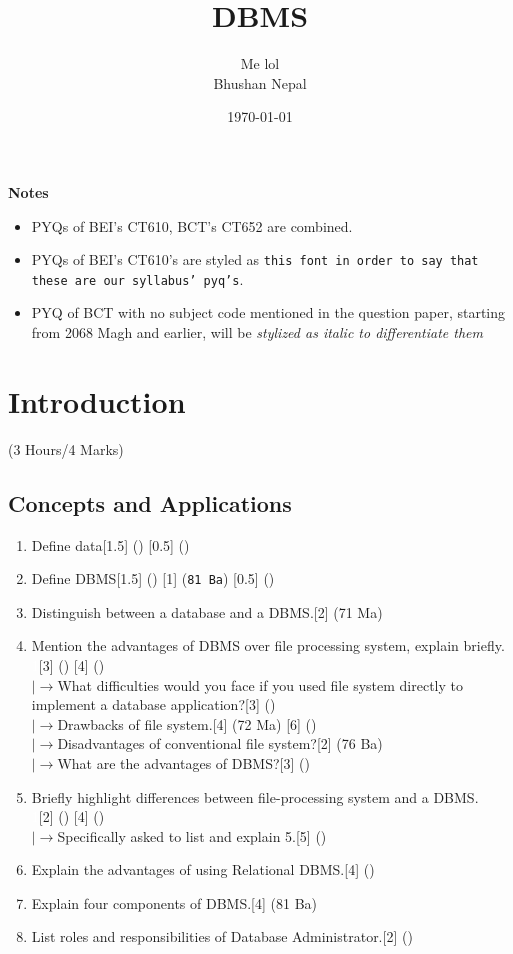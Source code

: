 \documentclass[12pt]{article}
\title{DBMS}
\author{Me lol\\Bhushan Nepal}
\date{\today}
\newcommand{\lb}{\\$\left|\rightarrow\right.$}
\newcommand{\enter}{\\\textcolor{white}{1}}
\begin{document}
\maketitle
\vspace{13cm}
\begin{large}\textbf{Notes}\end{large}
\begin{itemize}
\item PYQs of BEI's CT610, BCT's CT652 are combined.
\item PYQs of BEI's CT610's are styled as \texttt{this font in order to say that these are our syllabus' pyq's}.
\item PYQ of BCT with no subject code mentioned in the question paper, starting from 2068 Magh and earlier, will be \textit{stylized as italic to differentiate them}
\end{itemize}

\pagebreak
\tableofcontents
\pagebreak

\section{Introduction}
    \begin{center}(3 Hours/4 Marks)\end{center}
    \subsection{Concepts and Applications}
    \begin{enumerate}
        \item Define data\hfill[1.5] () [0.5] ()
        \item Define DBMS\hfill[1.5] () [1] (\texttt{81 Ba}) [0.5] ()
        \item Distinguish between a database and a DBMS.\hfill [2] (71 Ma)
        \item Mention the advantages of DBMS over file processing system, explain briefly.
        \enter\hfill[3] () [4] ()
            \lb What difficulties would you face if you used file system directly to implement a database application?\hfill[3] ()
            \lb Drawbacks of file system.\hfill [4] (72 Ma) [6] ()
            \lb Disadvantages of conventional file system?\hfill[2] (76 Ba)
            \lb What are the advantages of DBMS?\hfill[3] (\texttt{})
        \item Briefly highlight differences between file-processing system and a DBMS.
        \enter\hfill[2] () [4] ()
        \lb Specifically asked to list and explain 5.\hfill [5] ()
        \item Explain the advantages of using Relational DBMS.\hfill[4] ()
        \item Explain four components of DBMS.\hfill[4] (81 Ba)
        \item List roles and responsibilities of Database Administrator.\hfill[2] ()
        \end{enumerate}
\end{document}
